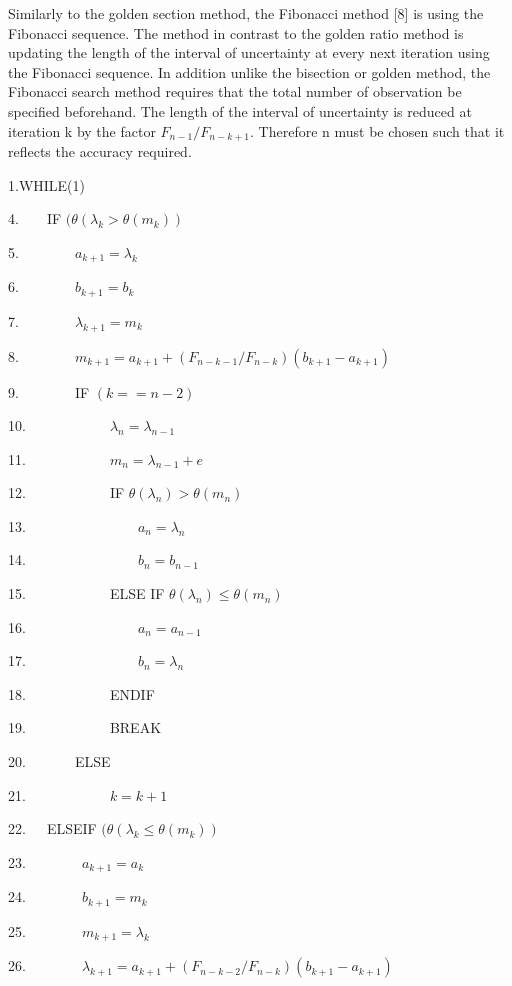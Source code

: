 \documentclass[times,12pt]{ACME2015article}
\newenvironment{lyxcode}
{\par\begin{list}{}{
\setlength{\rightmargin}{\leftmargin}
\setlength{\listparindent}{0pt}%
\raggedright
\setlength{\itemsep}{0pt}
\setlength{\parsep}{0pt}
\normalfont\ttfamily}%
 \item[]}
{\end{list}}
\begin{document}
Similarly to the golden section method, the Fibonacci method [8] is using the Fibonacci sequence. The method in contrast to the golden ratio method is updating the length of the interval of uncertainty at every next iteration using the Fibonacci sequence. In addition  unlike the bisection or golden method, the Fibonacci search method requires that the total number of observation be specified beforehand. The length of the interval of uncertainty is reduced at iteration k by the factor $F_{n-1}/F_{n-k+1}$. Therefore n must be chosen such that it reflects the accuracy required.
\begin{algorithm}
\begin{lyxcode}
1.WHILE(1)

4.~~~~IF $(\theta(\lambda_{k} > \theta(m_{k}))$

5.~~~~~~~~$a_{k+1} = \lambda_{k}$

6.~~~~~~~~$b_{k+1} = b_{k}$

7.~~~~~~~~$\lambda_{k+1} = m_{k}$

8.~~~~~~~~$m_{k+1} = a_{k+1} + (F_{n-k-1}/F_{n-k})(b_{k+1} - a_{k+1})$

9.~~~~~~~~IF $(k == n-2)$

10.~~~~~~~~~~~~$\lambda_{n} = \lambda_{n-1}$
				
11.~~~~~~~~~~~~$m_{n} = \lambda_{n-1} + e$

12.~~~~~~~~~~~~IF $\theta (\lambda_{n}) > \theta (m_{n})$
					
13.~~~~~~~~~~~~~~~~$a_{n} = \lambda_{n}$
					
14.~~~~~~~~~~~~~~~~$b_{n} = b_{n-1}$ 

15.~~~~~~~~~~~~ELSE IF $\theta (\lambda_{n}) \leq \theta (m_{n})$
					
16.~~~~~~~~~~~~~~~~$a_{n} = a_{n-1}$
					
17.~~~~~~~~~~~~~~~~$b_{n} = \lambda_{n}$
					
18.~~~~~~~~~~~~ENDIF

19.~~~~~~~~~~~~BREAK

20.~~~~~~~ELSE 

21.~~~~~~~~~~~~$k = k+1$

22.~~~ELSEIF $(\theta(\lambda_{k} \leq \theta(m_{k}))$

23.~~~~~~~~$a_{k+1} = a_{k}$

24.~~~~~~~~$b_{k+1} = m_{k}$

25.~~~~~~~~$m_{k+1} = \lambda_{k}$

26.~~~~~~~~$\lambda_{k+1} = a_{k+1} + (F_{n-k-2}/F_{n-k})(b_{k+1} - a_{k+1})$


\end{lyxcode}
\end{algorithm}
\end{document}
